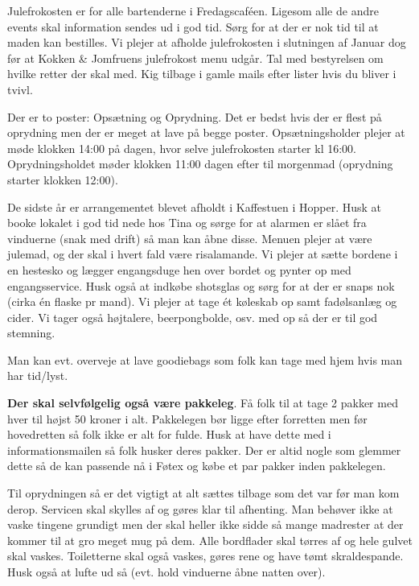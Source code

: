 Julefrokosten er for alle bartenderne i Fredagscaféen. Ligesom alle de andre events skal information sendes ud i god tid. Sørg for at der er nok tid til at maden kan bestilles. Vi plejer at afholde julefrokosten i slutningen af Januar dog før at Kokken \& Jomfruens julefrokost menu udgår. Tal med bestyrelsen om hvilke retter der skal med. Kig tilbage i gamle mails efter lister hvis du bliver i tvivl.

Der er to poster: Opsætning og Oprydning. Det er bedst hvis der er flest på oprydning men der er meget at lave på begge poster. Opsætningsholder plejer at møde klokken 14:00 på dagen, hvor selve julefrokosten starter kl 16:00. Oprydningsholdet møder klokken 11:00 dagen efter til morgenmad (oprydning starter klokken 12:00).

De sidste år er arrangementet blevet afholdt i Kaffestuen i Hopper. Husk at booke lokalet i god tid nede hos Tina og sørge for at alarmen er slået fra vinduerne (snak med drift) så man kan åbne disse. Menuen plejer at være julemad, og der skal i hvert fald være risalamande. Vi plejer at sætte bordene i en hestesko og lægger engangsduge hen over bordet og pynter op med engangsservice. Husk også at indkøbe shotsglas og sørg for at der er snaps nok (cirka én flaske pr mand). Vi plejer at tage ét køleskab op samt fadølsanlæg og cider. Vi tager også højtalere, beerpongbolde, osv. med op så der er til god stemning.

Man kan evt. overveje at lave goodiebags som folk kan tage med hjem hvis man har tid/lyst.

\textbf{Der skal selvfølgelig også være pakkeleg}. Få folk til at tage 2 pakker med hver til højst 50 kroner i alt. Pakkelegen bør ligge efter forretten men før hovedretten så folk ikke er alt for fulde. Husk at have dette med i informationsmailen så folk husker deres pakker. Der er altid nogle som glemmer dette så de kan passende nå i Føtex og købe et par pakker inden pakkelegen.

Til oprydningen så er det vigtigt at alt sættes tilbage som det var før man kom derop. Servicen skal skylles af og gøres klar til afhenting. Man behøver ikke at vaske tingene grundigt men der skal heller ikke sidde så mange madrester at der kommer til at gro meget mug på dem. Alle bordflader skal tørres af og hele gulvet skal vaskes. Toiletterne skal også vaskes, gøres rene og have tømt skraldespande. Husk også at lufte ud så (evt. hold vinduerne åbne natten over). \\ \\

